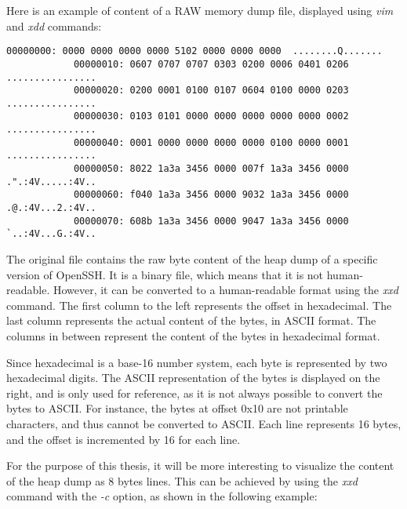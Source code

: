     \begin{minipage}{\dimexpr\linewidth-20pt}
        Here is an example of content of a RAW memory dump file, displayed using \textit{vim} and \textit{xdd} commands:

        \begin{lstlisting}[style=hexdump, caption={16 bytes per line visualization of a Hex Dump from \textit{Training/basic/V\_7\_8\_P1/16/5070-1643978841-heap.raw}}]
            00000000: 0000 0000 0000 0000 5102 0000 0000 0000  ........Q.......
            00000010: 0607 0707 0707 0303 0200 0006 0401 0206  ................
            00000020: 0200 0001 0100 0107 0604 0100 0000 0203  ................
            00000030: 0103 0101 0000 0000 0000 0000 0000 0002  ................
            00000040: 0001 0000 0000 0000 0000 0100 0000 0001  ................
            00000050: 8022 1a3a 3456 0000 007f 1a3a 3456 0000  .".:4V.....:4V..
            00000060: f040 1a3a 3456 0000 9032 1a3a 3456 0000  .@.:4V...2.:4V..
            00000070: 608b 1a3a 3456 0000 9047 1a3a 3456 0000  `..:4V...G.:4V..
        \end{lstlisting}
    \end{minipage}

    The original file contains the raw byte content of the heap dump of a specific version of OpenSSH. It is a binary file, which means that it is not human-readable. However, it can be converted to a human-readable format using the \textit{xxd} command. The first column to the left represents the offset in hexadecimal. The last column represents the actual content of the bytes, in ASCII format. The columns in between represent the content of the bytes in hexadecimal format.

    Since hexadecimal is a base-16 number system, each byte is represented by two hexadecimal digits. The ASCII representation of the bytes is displayed on the right, and is only used for reference, as it is not always possible to convert the bytes to ASCII. For instance, the bytes at offset 0x10 are not printable characters, and thus cannot be converted to ASCII. Each line represents 16 bytes, and the offset is incremented by 16 for each line.

    For the purpose of this thesis, it will be more interesting to visualize the content of the heap dump as 8 bytes lines. This can be achieved by using the \textit{xxd} command with the \textit{-c} option, as shown in the following example:

